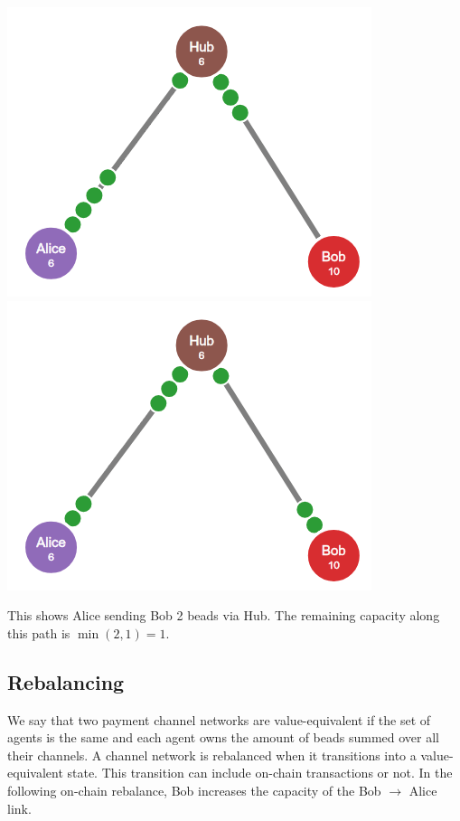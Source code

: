 \documentclass{article}
\begin{document}
\begin{center}
\includegraphics[scale=0.4]{beads.png}
\includegraphics[scale=0.4]{beads2.png}
\end{center}

This shows Alice sending Bob 2 beads via Hub. The remaining capacity along this path is $\min(2,1) = 1$.

\subsection*{Rebalancing}

We say that two payment channel networks are value-equivalent if the set of agents is the same and each agent owns the amount of beads summed over all their channels. A channel network is rebalanced when it transitions into a value-equivalent state. This transition can include on-chain transactions or not. In the following on-chain rebalance, Bob increases the capacity of the Bob $\to$ Alice link.
\end{document}
